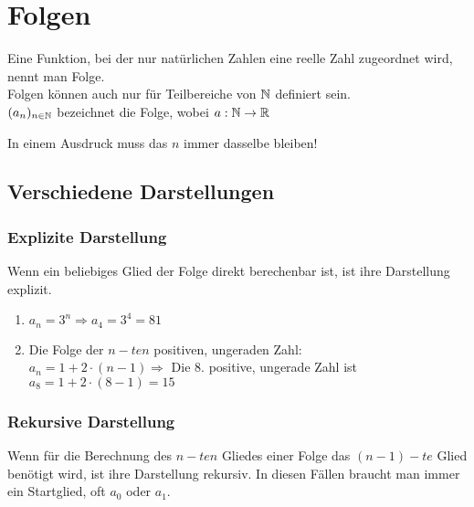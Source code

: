 \chapter{Folgen}



\begin{Definition}
Eine Funktion, bei der nur natürlichen Zahlen eine reelle Zahl zugeordnet wird, nennt man Folge.\\
Folgen können auch nur für Teilbereiche von $\mathbb{N}$ definiert sein.\\
$(a_{n})_{n\in\mathbb{N}}$ bezeichnet die Folge, wobei $a:\mathbb{N}\rightarrow\mathbb{R}$
\end{Definition}

\begin{Bemerkung}
In einem Ausdruck muss das $n$ immer dasselbe bleiben!
\end{Bemerkung}
		\section{Verschiedene Darstellungen}


	\subsection{Explizite Darstellung}

\begin{Definition}
Wenn ein beliebiges Glied der Folge direkt berechenbar ist, ist ihre Darstellung explizit.
\end{Definition}

\begin{Beispiel}
\begin{enumerate}
\item  $a_{n}=3^n \Rightarrow a_{4}=3^4=81$
\item Die Folge der $n-ten$ positiven, ungeraden Zahl:\\
$a_{n}=1+2\cdot(n-1) \Rightarrow$ Die 8. positive, ungerade Zahl ist $ a_{8}=1+2\cdot(8-1)=15$
\end{enumerate}
\end{Beispiel}


	\subsection{Rekursive Darstellung}

\begin{Definition}
Wenn für die Berechnung des $n-ten$ Gliedes einer Folge das $(n-1)-te$ Glied benötigt wird, ist ihre Darstellung rekursiv.
In diesen Fällen braucht man immer ein Startglied, oft $a_{0}$ oder $ a_{1}$.
\end{Definition}

